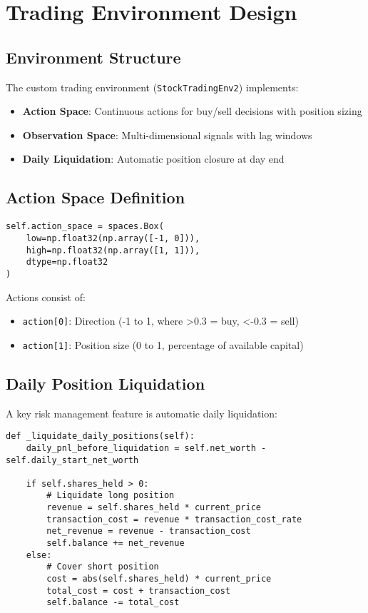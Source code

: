 \documentclass[11pt,a4paper]{article}
\begin{document}
\section{Trading Environment Design}

\subsection{Environment Structure}

The custom trading environment (\texttt{StockTradingEnv2}) implements:

\begin{itemize}
    \item \textbf{Action Space}: Continuous actions for buy/sell decisions with position sizing
    \item \textbf{Observation Space}: Multi-dimensional signals with lag windows
    \item \textbf{Daily Liquidation}: Automatic position closure at day end
\end{itemize}

\subsection{Action Space Definition}

\begin{lstlisting}[caption={Action Space (StockTradingEnv2.py:38-40)}]
self.action_space = spaces.Box(
    low=np.float32(np.array([-1, 0])), 
    high=np.float32(np.array([1, 1])), 
    dtype=np.float32
)
\end{lstlisting}

Actions consist of:
\begin{itemize}
    \item \texttt{action[0]}: Direction (-1 to 1, where >0.3 = buy, <-0.3 = sell)
    \item \texttt{action[1]}: Position size (0 to 1, percentage of available capital)
\end{itemize}

\subsection{Daily Position Liquidation}

A key risk management feature is automatic daily liquidation:

\begin{lstlisting}[caption={Daily Liquidation (StockTradingEnv2.py:60-105)}]
def _liquidate_daily_positions(self):
    daily_pnl_before_liquidation = self.net_worth - self.daily_start_net_worth
    
    if self.shares_held > 0:
        # Liquidate long position
        revenue = self.shares_held * current_price
        transaction_cost = revenue * transaction_cost_rate
        net_revenue = revenue - transaction_cost
        self.balance += net_revenue
    else:
        # Cover short position  
        cost = abs(self.shares_held) * current_price
        total_cost = cost + transaction_cost
        self.balance -= total_cost
\end{lstlisting}
\end{document}
